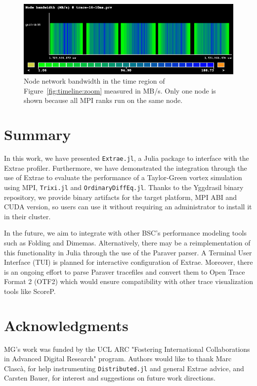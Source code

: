 \documentclass{juliacon}
\newcommand{\jlpkg}[1]{\texttt{#1}}
\newcommand{\extraejl}{\jlpkg{Extrae.jl}}
\begin{document}
\begin{figure}
    \centering
    \includegraphics[width=\linewidth]{Node_bandwidth_MB_s-trace-16-10ms.w_legend.png}
    \caption{Node network bandwidth in the time region of Figure~\ref{fig:timeline:zoom} measured in MB/s. Only one node is shown because all MPI ranks run on the same node.}
    \label{fig:node-bw}
\end{figure}

\section{Summary}\label{sec:summary}

In this work, we have presented \extraejl, a Julia package to interface with the Extrae profiler.
Furthermore, we have demonstrated the integration through the use of Extrae to evaluate the performance of a Taylor-Green vortex simulation using MPI, \jlpkg{Trixi.jl} and \jlpkg{OrdinaryDiffEq.jl}.
Thanks to the Yggdrasil binary repository, we provide binary artifacts for the target platform, MPI ABI and CUDA version, so users can use it without requiring an administrator to install it in their cluster.

In the future, we aim to integrate with other BSC's performance modeling tools such as Folding and Dimemas.
Alternatively, there may be a reimplementation of this functionality in Julia through the use of the Paraver parser.
A Terminal User Interface (TUI) is planned for interactive configuration of Extrae.
Moreover, there is an ongoing effort to parse Paraver tracefiles and convert them to Open Trace Format 2 (OTF2) which would ensure compatibility with other trace visualization tools like ScoreP.

\section{Acknowledgments}

MG's work was funded by the UCL ARC "Fostering International Collaborations in Advanced Digital Research" program.
Authors would like to thank Marc Clascà, for help instrumenting \jlpkg{Distributed.jl} and general Extrae advice, and Carsten Bauer, for interest and suggestions on future work directions.


\end{document}
